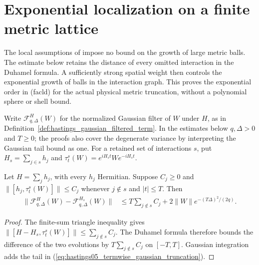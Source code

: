 \section{Exponential localization on a finite metric lattice}
\label{sec:hastings05_metric_localization}

The local assumptions of\cite[lines 169--190]{Hastings2006Solving}
impose no bound on the growth of large metric balls. The estimate below
retains the distance of every omitted interaction in the Duhamel formula.
A sufficiently strong spatial weight then controls the exponential growth
of balls in the interaction graph. This proves the exponential order in
(facld) for the actual physical metric truncation, without a polynomial
sphere or shell bound\cite{gap:hastings05_geometric_growth_scope}.

Write $\mathcal F_{q,\Delta}^{H}(W)$ for the normalized Gaussian filter of
$W$ under $H$, as in Definition~\ref{def:hastings_gaussian_filtered_term}.
In the estimates below $q,\Delta>0$ and $T\ge0$; the proofs also cover the
degenerate variance by interpreting the Gaussian tail bound as one.
For a retained set of interactions $s$, put $H_s=\sum_{j\in s}h_j$ and
$\tau_t^s(W)=e^{iH_st}We^{-iH_st}$.

\begin{lemma}
    \label{thm:hastings05_termwise_gaussian_truncation}
    \leanok
    Let $H=\sum_jh_j$, with every $h_j$ Hermitian. Suppose $C_j\ge0$ and
    $\|[h_j,\tau_t^s(W)]\|\le C_j$ whenever $j\notin s$ and $|t|\le T$.
    Then
    \begin{align}
        \|\mathcal F_{q,\Delta}^{H}(W)-\mathcal F_{q,\Delta}^{H_s}(W)\|
         & \le T\sum_{j\notin s}C_j
        +2\|W\|e^{-(T\Delta)^2/(2q)}.
        \label{eq:hastings05_termwise_gaussian_truncation}
    \end{align}
\end{lemma}
\begin{proof}\leanok
    The finite-sum triangle inequality gives
    $\|[H-H_s,\tau_t^s(W)]\|\le\sum_{j\notin s}C_j$.
    The Duhamel formula therefore bounds the difference of the two
    evolutions by $T\sum_{j\notin s}C_j$ on $[-T,T]$.
    Gaussian integration adds the tail in
    (\ref{eq:hastings05_termwise_gaussian_truncation}).
\end{proof}

